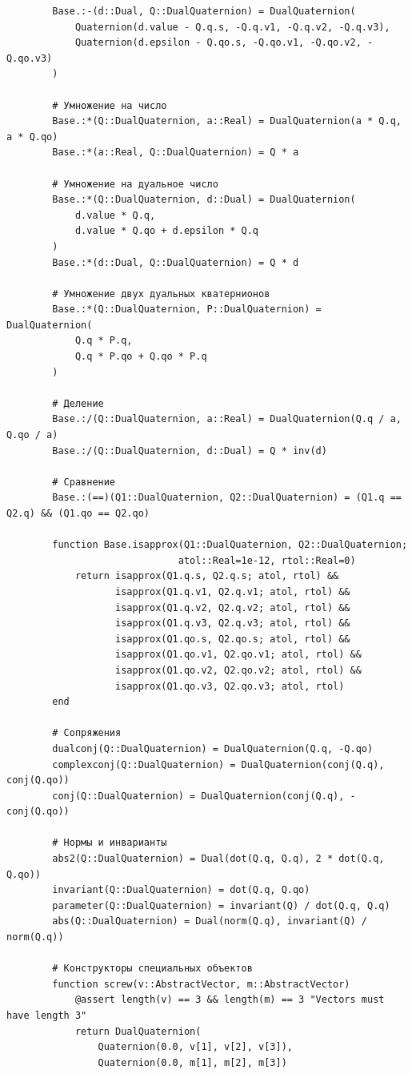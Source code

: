\begin{verbatim}
        Base.:-(d::Dual, Q::DualQuaternion) = DualQuaternion(
            Quaternion(d.value - Q.q.s, -Q.q.v1, -Q.q.v2, -Q.q.v3),
            Quaternion(d.epsilon - Q.qo.s, -Q.qo.v1, -Q.qo.v2, -Q.qo.v3)
        )
        
        # Умножение на число
        Base.:*(Q::DualQuaternion, a::Real) = DualQuaternion(a * Q.q, a * Q.qo)
        Base.:*(a::Real, Q::DualQuaternion) = Q * a
        
        # Умножение на дуальное число
        Base.:*(Q::DualQuaternion, d::Dual) = DualQuaternion(
            d.value * Q.q,
            d.value * Q.qo + d.epsilon * Q.q
        )
        Base.:*(d::Dual, Q::DualQuaternion) = Q * d
        
        # Умножение двух дуальных кватернионов
        Base.:*(Q::DualQuaternion, P::DualQuaternion) = DualQuaternion(
            Q.q * P.q,
            Q.q * P.qo + Q.qo * P.q
        )
        
        # Деление
        Base.:/(Q::DualQuaternion, a::Real) = DualQuaternion(Q.q / a, Q.qo / a)
        Base.:/(Q::DualQuaternion, d::Dual) = Q * inv(d)
        
        # Сравнение
        Base.:(==)(Q1::DualQuaternion, Q2::DualQuaternion) = (Q1.q == Q2.q) && (Q1.qo == Q2.qo)
        
        function Base.isapprox(Q1::DualQuaternion, Q2::DualQuaternion; 
                              atol::Real=1e-12, rtol::Real=0)
            return isapprox(Q1.q.s, Q2.q.s; atol, rtol) &&
                   isapprox(Q1.q.v1, Q2.q.v1; atol, rtol) &&
                   isapprox(Q1.q.v2, Q2.q.v2; atol, rtol) &&
                   isapprox(Q1.q.v3, Q2.q.v3; atol, rtol) &&
                   isapprox(Q1.qo.s, Q2.qo.s; atol, rtol) &&
                   isapprox(Q1.qo.v1, Q2.qo.v1; atol, rtol) &&
                   isapprox(Q1.qo.v2, Q2.qo.v2; atol, rtol) &&
                   isapprox(Q1.qo.v3, Q2.qo.v3; atol, rtol)
        end
        
        # Сопряжения
        dualconj(Q::DualQuaternion) = DualQuaternion(Q.q, -Q.qo)
        complexconj(Q::DualQuaternion) = DualQuaternion(conj(Q.q), conj(Q.qo))
        conj(Q::DualQuaternion) = DualQuaternion(conj(Q.q), -conj(Q.qo))
        
        # Нормы и инварианты
        abs2(Q::DualQuaternion) = Dual(dot(Q.q, Q.q), 2 * dot(Q.q, Q.qo))
        invariant(Q::DualQuaternion) = dot(Q.q, Q.qo)
        parameter(Q::DualQuaternion) = invariant(Q) / dot(Q.q, Q.q)
        abs(Q::DualQuaternion) = Dual(norm(Q.q), invariant(Q) / norm(Q.q))
        
        # Конструкторы специальных объектов
        function screw(v::AbstractVector, m::AbstractVector)
            @assert length(v) == 3 && length(m) == 3 "Vectors must have length 3"
            return DualQuaternion(
                Quaternion(0.0, v[1], v[2], v[3]),
                Quaternion(0.0, m[1], m[2], m[3])

\end{verbatim}
